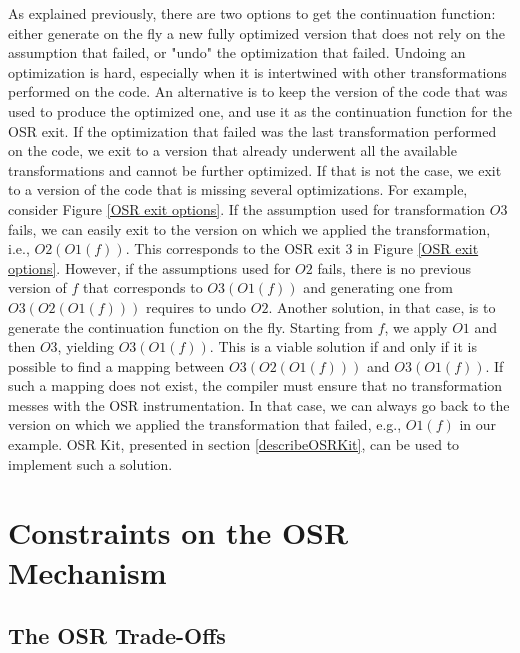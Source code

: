 As explained previously, there are two options to get the continuation function: either generate on the fly a new fully optimized version that does not rely on the assumption that failed, or "undo" the optimization that failed.
Undoing an optimization is hard, especially when it is intertwined with other transformations performed on the code.
An alternative is to keep the version of the code that was used to produce the optimized one, and use it as the continuation function for the OSR exit.
If the optimization that failed was the last transformation performed on the code, we exit to a version that already underwent all the available transformations and cannot be further optimized.
If that is not the case, we exit to a version of the code that is missing several optimizations.
For example, consider Figure \ref{OSR exit options}. 
If the assumption used for transformation $O3$ fails, we can easily exit to the version on which we applied the transformation, i.e., $O2(O1(f))$.
This corresponds to the OSR exit 3 in Figure \ref{OSR exit options}.
However, if the assumptions used for $O2$ fails, there is no previous version of $f$ that corresponds to $O3(O1(f))$ and generating one from $O3(O2(O1(f)))$ requires to undo $O2$.
Another solution, in that case, is to generate the continuation function on the fly.
Starting from $f$, we apply $O1$ and then $O3$, yielding $O3(O1(f))$.
This is a viable solution if and only if it is possible to find a mapping between $O3(O2(O1(f)))$ and $O3(O1(f))$.
If such a mapping does not exist, the compiler must ensure that no transformation messes with the OSR instrumentation.
In that case, we can always go back to the version on which we applied the transformation that failed, e.g., $O1(f)$ in our example.
OSR Kit, presented in section \ref{describeOSRKit}, can be used to implement such a solution.\\

\section{Constraints on the OSR Mechanism}
\subsection{The OSR Trade-Offs}\label{tradeOffs}

